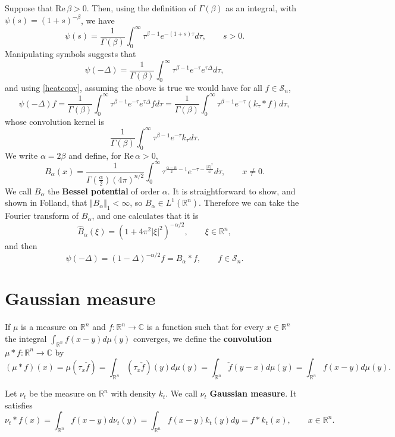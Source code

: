 \documentclass{article}
\def\Re{\ensuremath{\mathrm{Re}}\,}
\newcommand{\norm}[1]{\Vert #1 \Vert}
\begin{document}
Suppose that $\Re \beta>0$. Then, using the definition of $\Gamma(\beta)$ as an integral, with
$\psi(s)=(1+s)^{-\beta}$, we have
\[
\psi(s) = \frac{1}{\Gamma(\beta)} \int_0^\infty \tau^{\beta-1} e^{-(1+s)\tau} d\tau, \qquad s>0.
\]
Manipulating symbols suggests that
\[
\psi(-\Delta) = \frac{1}{\Gamma(\beta)} \int_0^\infty \tau^{\beta-1} e^{-\tau} e^{\tau \Delta} d\tau,
\]
and using \eqref{heatconv}, assuming the above is true we would have for all $f \in \mathscr{S}_n$,
\[
\psi(-\Delta) f =  \frac{1}{\Gamma(\beta)} \int_0^\infty \tau^{\beta-1} e^{-\tau} e^{\tau \Delta} f d\tau=
 \frac{1}{\Gamma(\beta)} \int_0^\infty \tau^{\beta-1} e^{-\tau} (k_\tau * f) d\tau,
\]
whose convolution kernel is
\[
 \frac{1}{\Gamma(\beta)} \int_0^\infty \tau^{\beta-1} e^{-\tau} k_\tau d\tau.
\]
We write $\alpha=2\beta$ and define, for $\Re \alpha>0$,
\[
B_\alpha(x) = \frac{1}{\Gamma\left(\frac{\alpha}{2}\right) (4\pi)^{n/2}} \int_0^\infty \tau^{\frac{\alpha-n}{2}-1}
e^{-\tau-\frac{|x|^2}{4\tau}} d\tau, \qquad x \neq 0.
\]
We call $B_\alpha$ the \textbf{Bessel potential} of order $\alpha$. It is straightforward to show, and shown in Folland, that
$\norm{B_\alpha}_1<\infty$, so $B_\alpha \in L^1(\mathbb{R}^n)$. Therefore we can take the Fourier transform of $B_\alpha$,
and one calculates that it is
\[
\widehat{B}_\alpha(\xi) = (1+4\pi^2 |\xi|^2)^{-\alpha/2}, \qquad \xi \in \mathbb{R}^n,
\]
and then
\[
\psi(-\Delta) = (1-\Delta)^{-\alpha/2} f = B_\alpha * f, \qquad f \in \mathscr{S}_n.
\]


\section{Gaussian measure}
If $\mu$ is a measure on $\mathbb{R}^n$ and
$f:\mathbb{R}^n \to \mathbb{C}$ is a function
such that for every $x \in \mathbb{R}^n$ the integral $\int_{\mathbb{R}^n} f(x-y) d\mu(y)$ converges,
we define the \textbf{convolution} $\mu*f:\mathbb{R}^n \to \mathbb{C}$ by
\[
(\mu*f)(x) = \mu(\tau_x \check f) = \int_{\mathbb{R}^n} (\tau_x \check{f})(y) d\mu(y) = \int_{\mathbb{R}^n} \check{f}(y-x) d\mu(y)
=\int_{\mathbb{R}^n} f(x-y) d\mu(y).
\]

Let $\nu_t$ be the measure on $\mathbb{R}^n$ with density $k_t$. 
We call $\nu_t$ \textbf{Gaussian measure}.  It satisfies
\[
\nu_t * f (x) = \int_{\mathbb{R}^n} f(x-y) d\nu_t(y) = \int_{\mathbb{R}^n} f(x-y) k_t(y) dy = f*k_t(x), \qquad x \in \mathbb{R}^n.
\]
\end{document}
